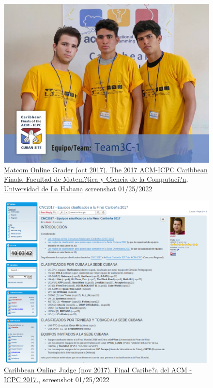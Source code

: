 \documentclass{article}
\begin{document}
\begin{figure}[h]
    \centering
    \includegraphics[width=\textwidth]{images/team3c.jpg}
    \caption{\href{https://matcomgrader.com/post/5167/the-2017-acm-icpc-caribbean-finals}{Matcom Online Grader (oct 2017). The 2017 ACM-ICPC Caribbean Finals. Facultad de Matem?tica y Ciencia de la Computaci?n, Universidad de La Habana} screenshot 01/25/2022}
    \label{sec:3c}
\end{figure}
\begin{figure}[h]
    \centering
    \includegraphics[width=\textwidth]{images/icpc_classified.png}
    \caption{\href{ https://coj-forum.uci.cu/viewtopic.php?t=3315}{Caribbean Online Judge (nov 2017). Final Caribe?a del ACM - ICPC 2017.}, screenshot 01/25/2022}
    \label{sec:icpc}
\end{figure}
\end{document}

